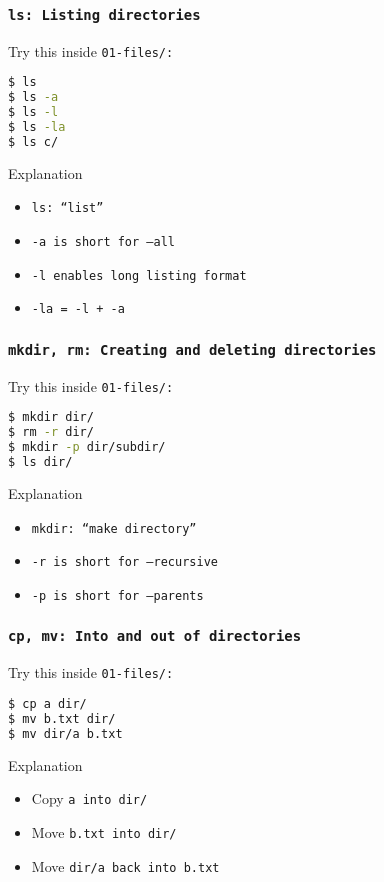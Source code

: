 \begin{frame}[fragile]
\frametitle{\tt{ls}: Listing directories}
Try this inside \tt{01-files/}:
\begin{lstlisting}[language=bash]
$ ls
$ ls -a
$ ls -l
$ ls -la
$ ls c/
\end{lstlisting}
\begin{block}{Explanation}
    \begin{itemize}
        \item \tt{ls}: ``list''
        \item \tt{-a} is short for \tt{--all}
        \item \tt{-l} enables long listing format
        \item \tt{-la} = \tt{-l} + \tt{-a}
    \end{itemize}
\end{block}
\end{frame}

\begin{frame}[fragile]
\frametitle{\tt{mkdir, rm}: Creating and deleting directories}
Try this inside \tt{01-files/}:
\begin{lstlisting}[language=bash]
$ mkdir dir/
$ rm -r dir/
$ mkdir -p dir/subdir/
$ ls dir/
\end{lstlisting}
\begin{block}{Explanation}
    \begin{itemize}
        \item \tt{mkdir}: ``make directory''
        \item \tt{-r} is short for \tt{--recursive}
        \item \tt{-p} is short for \tt{--parents}
    \end{itemize}
\end{block}
\end{frame}

\begin{frame}[fragile]
\frametitle{\tt{cp, mv}: Into and out of directories}
Try this inside \tt{01-files/}:
\begin{lstlisting}[language=bash]
$ cp a dir/
$ mv b.txt dir/
$ mv dir/a b.txt
\end{lstlisting}
\begin{block}{Explanation}
    \begin{itemize}
        \item Copy \tt{a} into \tt{dir/}
        \item Move \tt{b.txt} into \tt{dir/}
        \item Move \tt{dir/a} back into \tt{b.txt}
    \end{itemize}
\end{block}
\end{frame}

